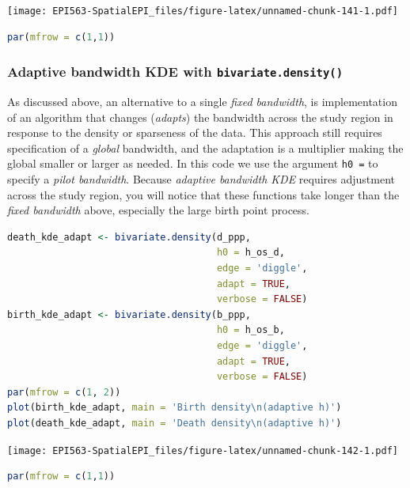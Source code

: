 \documentclass[
]{book}
\newcommand{\passthrough}[1]{#1}
\begin{document}
\texttt{[image: EPI563-SpatialEPI\_files/figure-latex/unnamed-chunk-141-1.pdf]}

\begin{lstlisting}[language=R]
par(mfrow = c(1,1))
\end{lstlisting}

\hypertarget{adaptive-bandwidth-kde-with-bivariate.density}{%
\subsubsection{\texorpdfstring{Adaptive bandwidth KDE with \texttt{bivariate.density()}}{Adaptive bandwidth KDE with bivariate.density()}}\label{adaptive-bandwidth-kde-with-bivariate.density}}

As discussed above, an alternative to a single \emph{fixed bandwidth}, is implementation of an algorithm that changes (\emph{adapts}) the bandwidth across the study region in response to the density or sparseness of the data. This approach still requires specification of a \emph{global} bandwidth, and the adaptation is a multiplier making the global smaller or larger as needed. In this code we use the argument \passthrough{\lstinline!h0 =!} to specify a \emph{pilot bandwidth}. Because \emph{adaptive bandwidth KDE} requires adjustment across the study region, you will notice that these functions take longer than the \emph{fixed bandwidth} above, especially the large birth point process.

\begin{lstlisting}[language=R]
death_kde_adapt <- bivariate.density(d_ppp, 
                                     h0 = h_os_d, 
                                     edge = 'diggle', 
                                     adapt = TRUE,
                                     verbose = FALSE)
birth_kde_adapt <- bivariate.density(b_ppp, 
                                     h0 = h_os_b, 
                                     edge = 'diggle',
                                     adapt = TRUE,
                                     verbose = FALSE)
par(mfrow = c(1, 2))
plot(birth_kde_adapt, main = 'Birth density\n(adaptive h)')
plot(death_kde_adapt, main = 'Death density\n(adaptive h)')
\end{lstlisting}

\texttt{[image: EPI563-SpatialEPI\_files/figure-latex/unnamed-chunk-142-1.pdf]}

\begin{lstlisting}[language=R]
par(mfrow = c(1,1))
\end{lstlisting}
\end{document}

